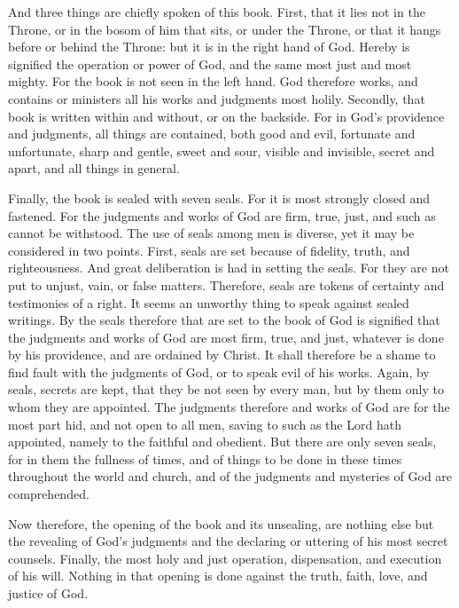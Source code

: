 And three things are chiefly spoken of this book. First, that it lies not in the Throne, or in the bosom of him that sits, or under the Throne, or that it hangs before or behind the Throne: but it is in the right hand of God. Hereby is signified the operation or power of God, and the same most just and most mighty. For the book is not seen in the left hand. God therefore works, and contains or ministers all his works and judgments most holily. Secondly, that book is written within and without, or on the backside. For in God’s providence and judgments, all things are contained, both good and evil, fortunate and unfortunate, sharp and gentle, sweet and sour, visible and invisible, secret and apart, and all things in general.

Finally, the book is sealed with seven seals. For it is most strongly closed and fastened. For the judgments and works of God are firm, true, just, and such as cannot be withstood. The use of seals among men is diverse, yet it may be considered in two points. First, seals are set because of fidelity, truth, and righteousness. And great deliberation is had in setting the seals. For they are not put to unjust, vain, or false matters. Therefore, seals are tokens of certainty and testimonies of a right. It seems an unworthy thing to speak against sealed writings. By the seals therefore that are set to the book of God is signified that the judgments and works of God are most firm, true, and just, whatever is done by his providence, and are ordained by Christ. It shall therefore be a shame to find fault with the judgments of God, or to speak evil of his works. Again, by seals, secrets are kept, that they be not seen by every man, but by them only to whom they are appointed. The judgments therefore and works of God are for the most part hid, and not open to all men, saving to such as the Lord hath appointed, namely to the faithful and obedient. But there are only seven seals, for in them the fullness of times, and of things to be done in these times throughout the world and church, and of the judgments and mysteries of God are comprehended.

Now therefore, the opening of the book and its unsealing, are nothing else but the revealing of God’s judgments and the declaring or uttering of his most secret counsels. Finally, the most holy and just operation, dispensation, and execution of his will. Nothing in that opening is done against the truth, faith, love, and justice of God.

